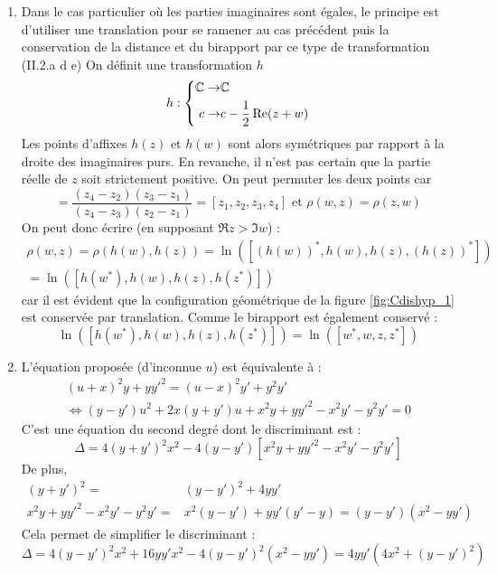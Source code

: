 \begin{enumerate}
\item Dans le cas particulier où les parties imaginaires sont égales, le principe est d'utiliser une translation pour se ramener au cas précédent puis la conservation de la distance et du birapport par ce type de transformation (II.2.a d e) \newline
On définit une transformation $h$ 
\begin{displaymath}
 h : \left\lbrace 
\begin{aligned}
 \mathbb{C} \rightarrow& \mathbb{C} \\
 c \rightarrow& c -\dfrac{1}{2}\operatorname{Re}(z+w) 
\end{aligned}
\right. 
\end{displaymath}
Les points d'affixes $h(z)$ et $h(w)$ sont alors symétriques par rapport à la droite des imaginaires purs. En revanche, il n'est pas certain que la partie réelle de $z$ soit strictement positive. On peut permuter les deux points car 
\begin{displaymath}
 [z_4,z_3,z_2,z_1] = \dfrac{(z_4-z_2)(z_3-z_1)}{(z_4-z_3)(z_2-z_1)} = [z_1,z_2,z_3,z_4] \text{ et }
\rho(w,z)=\rho(z,w)
\end{displaymath}
On peut donc écrire (en supposant $\Re z > \Im w$) :
\begin{multline*}
 \rho(w,z)=\rho(h(w),h(z))=\ln([(h(w))^*,h(w),h(z),(h(z))^*])\\=\ln([h(w^*),h(w),h(z),h(z^*)])
\end{multline*}
car il est évident que la configuration géométrique de la figure \ref{fig:Cdishyp_1} est conservée par translation. Comme le birapport est également conservé :
\begin{displaymath}
 \ln([h(w^*),h(w),h(z),h(z^*)]) = \ln([w^*,w,z,z^*]) 
\end{displaymath}
\item L'équation proposée (d'inconnue $u$) est équivalente à :
\begin{multline*}
 (u+x)^2y+yy'^2 = (u-x)^2y'+y^2y' \\
\Leftrightarrow
(y-y')u^2 +2x(y+y')u+x^2y+yy'^2-x^2y'-y^2y' = 0
\end{multline*}
C'est une équation du second degré dont le discriminant est :
\begin{displaymath}
 \Delta = 4(y+y')^2x^2-4(y-y')\left[ x^2y+yy'^2-x^2y'-y^2y'\right] 
\end{displaymath}
De plus,
\begin{align*}
 (y+y')^2 =& (y-y')^2 +4yy' \\
x^2y+yy'^2-x^2y'-y^2y' =& x^2(y-y') +yy'(y'-y)=(y-y')(x^2-yy')
\end{align*}
Cela permet de simplifier le discriminant :
\begin{displaymath}
 \Delta = 4(y-y')^2x^2 +16yy'x^2-4(y-y')^2(x^2-yy') = 4yy'(4x^2+(y-y')^2)
\end{displaymath}


\end{enumerate}
